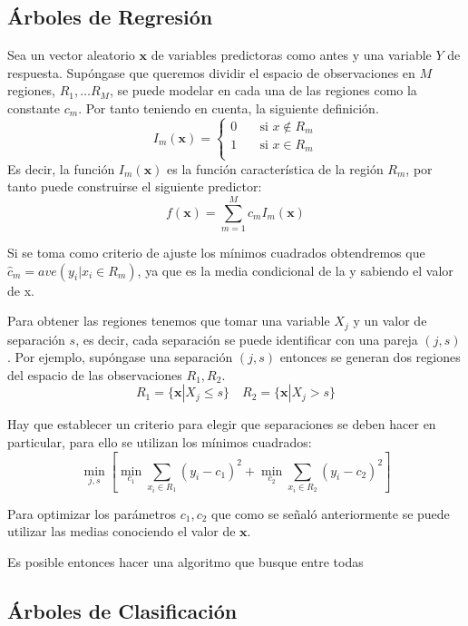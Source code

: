 \subsection{Árboles de Regresión}
\noindent Sea un vector aleatorio $\textbf{x}$ de variables predictoras como antes y una variable $Y$ de respuesta. 
Supóngase que queremos dividir el espacio de observaciones en $M$ regiones, $R_1,\ldots R_M$, se puede modelar en cada una de las regiones como la constante $c_m$. Por tanto teniendo en cuenta, la siguiente definición. 
\begin{equation}
I_m(\textbf{x})=
\begin{cases}
0\quad& \text{si } x\notin R_m\\
1\quad& \text{si } x\in R_m\\
\end{cases}
\end{equation}
Es decir, la función $I_m(\textbf{x})$ es la función característica de la región $R_m$, por tanto puede construirse el siguiente predictor:
\begin{equation}
f(\textbf{x})=\sum_{m=1}^M c_m I_m(\textbf{x})
\end{equation}

\noindent Si se toma como criterio de ajuste los mínimos cuadrados obtendremos que $\hat{c}_m=ave(y_i|x_i\in R_m)$, ya que es la media condicional de la y sabiendo el valor de x. 

\noindent Para obtener las regiones tenemos que tomar una variable $X_j$ y un valor de separación $s$, es decir, cada separación se puede identificar con una pareja $(j,s)$. 
Por ejemplo, supóngase una separación $(j,s)$ entonces se generan dos regiones del espacio de las observaciones $R_1, R_2$. 
\begin{equation}
R_1=\lbrace\textbf{x}|X_j\leq s\rbrace\quad R_2=\lbrace\textbf{x}|X_j > s\rbrace 
\end{equation}

\noindent Hay que establecer un criterio para elegir que separaciones se deben hacer en particular, para ello se utilizan los mínimos cuadrados:
\begin{equation}
\min_{j,s}\left[\min_{c_1}\sum_{x_i\in R_1}(y_i-c_1)^2+\min_{c_2}\sum_{x_i\in R_2}(y_i-c_2)^2\right]
\end{equation}

\noindent Para optimizar los parámetros $c_1,c_2$ que como se señaló anteriormente se puede utilizar las medias conociendo el valor de $\textbf{x}$. 

\noindent Es posible entonces hacer una algoritmo que busque entre todas

 
\subsection{Árboles de Clasificación }